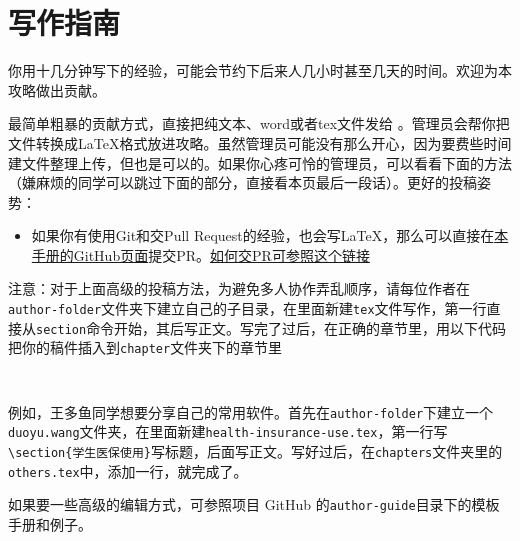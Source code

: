 \chapter{写作指南}
\label{chapter.author-ins}


你用十几分钟写下的经验，可能会节约下后来人几小时甚至几天的时间。欢迎为本攻略做出贡献。

最简单粗暴的贡献方式，直接把纯文本、word或者tex文件发给 \Shiyao。管理员会帮你把文件转换成\LaTeX{}格式放进攻略。虽然管理员可能没有那么开心，因为要费些时间建文件整理上传，但也是可以的。如果你心疼可怜的管理员，可以看看下面的方法（嫌麻烦的同学可以跳过下面的部分，直接看本页最后一段话）。更好的投稿姿势：


\begin{itemize}
    \item 如果你有使用Git和交Pull Request的经验，也会写\LaTeX{}，那么可以直接在\href{https://github.com/xp-pgrs-unofficial-guide/xp_pgrs_unofficial_guide}{本手册的GitHub页面}提交PR。\href{https://www.zhihu.com/question/21682976/answer/79489643}{如何交PR可参照这个链接}
\end{itemize} 

\vspace{5mm}
注意：对于上面高级的投稿方法，为避免多人协作弄乱顺序，请每位作者在\texttt{author-folder}文件夹下建立自己的子目录，在里面新建\texttt{tex}文件写作，第一行直接从\texttt{section}命令开始，其后写正文。写完了过后，在正确的章节里，用以下代码把你的稿件插入到\texttt{chapter}文件夹下的章节里
\begin{lstlisting}
    
\end{lstlisting} 
例如，王多鱼同学想要分享自己的常用软件。首先在\texttt{author-folder}下建立一个\texttt{duoyu.wang}文件夹，在里面新建\texttt{health-insurance-use.tex}，第一行写\lstinline[breaklines=true]!\section{学生医保使用}!写标题，后面写正文。写好过后，在\texttt{chapters}文件夹里的\texttt{others.tex}中，添加一行\lstinline[breaklines=true]!!，就完成了。

\vspace{5mm}
如果要一些高级的编辑方式，可参照项目 GitHub 的\texttt{author-guide}目录下的模板手册和例子。

